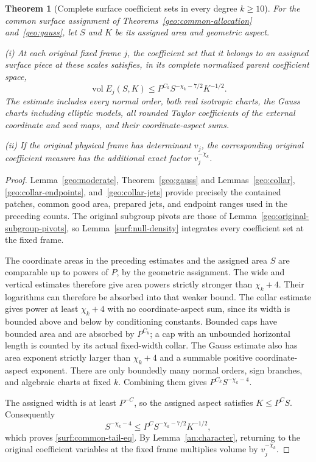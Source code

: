 \documentclass[11pt]{amsart}
\newtheorem{theorem}{Theorem}[section]
\theoremstyle{definition}
\theoremstyle{remark}
\numberwithin{equation}{section}
\begin{document}
\begin{theorem}[Complete surface coefficient sets in every degree $k\ge10$]\label{surf:common-tail}
For the common surface assignment of Theorems~\ref{geo:common-allocation} and~\ref{geo:gauss}, let $S$ and $K$ be its assigned area and geometric aspect.

\noindent\textup{(i)} At each original fixed frame $j$, the coefficient set that it belongs to an assigned surface piece at these scales satisfies, in its complete normalized parent coefficient space,
\begin{equation}\label{surf:common-tail-eq}
 \operatorname{vol}E_j(S,K)\le P^{C_k}S^{-\chi_k-7/2}K^{-1/2}.
\end{equation}
The estimate includes every normal order, both real isotropic charts, the Gauss charts including elliptic models, all rounded Taylor coefficients of the external coordinate and seed maps, and their coordinate-aspect sums.

\noindent\textup{(ii)} If the original physical frame has determinant $v_j$, the corresponding original coefficient measure has the additional exact factor $v_j^{-\chi_k}$.
\end{theorem}
\begin{proof}
Lemma~\ref{geo:moderate}, Theorem~\ref{geo:gauss} and Lemmas~\ref{geo:collar}, \ref{geo:collar-endpoints}, and~\ref{geo:collar-jets} provide precisely the contained patches, common good area, prepared jets, and endpoint ranges used in the preceding counts. The original subgroup pivots are those of Lemma~\ref{geo:original-subgroup-pivots}, so Lemma~\ref{surf:null-density} integrates every coefficient set at the fixed frame.

The coordinate areas in the preceding estimates and the assigned area $S$ are comparable up to powers of $P$, by the geometric assignment. The wide and vertical estimates therefore give area powers strictly stronger than $\chi_k+4$. Their logarithms can therefore be absorbed into that weaker bound. The collar estimate gives power at least $\chi_k+4$ with no coordinate-aspect sum, since its width is bounded above and below by conditioning constants. Bounded caps have bounded area and are absorbed by $P^{C_k}$; a cap with an unbounded horizontal length is counted by its actual fixed-width collar. The Gauss estimate also has area exponent strictly larger than $\chi_k+4$ and a summable positive coordinate-aspect exponent. There are only boundedly many normal orders, sign branches, and algebraic charts at fixed $k$. Combining them gives $P^{C_k}S^{-\chi_k-4}$.

The assigned width is at least $P^{-C}$, so the assigned aspect satisfies $K\le P^CS$. Consequently
\[
S^{-\chi_k-4}\le P^CS^{-\chi_k-7/2}K^{-1/2},
\]
which proves \eqref{surf:common-tail-eq}. By Lemma~\ref{an:character}, returning to the original coefficient variables at the fixed frame multiplies volume by $v_j^{-\chi_k}$.
\end{proof}
\end{document}
